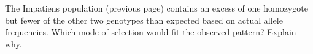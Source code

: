 \question[4]
The Impatiens population (previous page) contains an excess of one homozygote but fewer of the other two genotypes than expected based on actual allele frequencies.  Which mode of selection would fit the observed pattern?  Explain why. 

